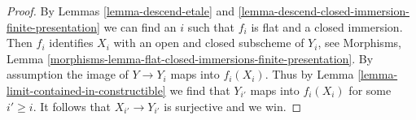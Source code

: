 \documentclass[10pt,a4paper]{amsart}
\theoremstyle{plain}
\theoremstyle{definition}
\theoremstyle{remark}
\numberwithin{equation}{subsection}
\begin{document}
\begin{proof}
By Lemmas \ref{lemma-descend-etale} and
\ref{lemma-descend-closed-immersion-finite-presentation}
we can find an $i$ such that $f_i$ is flat and a closed immersion.
Then $f_i$ identifies $X_i$ with an open and closed subscheme of
$Y_i$, see Morphisms, Lemma
\ref{morphisms-lemma-flat-closed-immersions-finite-presentation}.
By assumption the image of $Y \to Y_i$ maps into $f_i(X_i)$.
Thus by Lemma \ref{lemma-limit-contained-in-constructible}
we find that $Y_{i'}$ maps into $f_i(X_i)$ for some $i' \geq i$.
It follows that $X_{i'} \to Y_{i'}$ is surjective and we win.
\end{proof}
\end{document}
